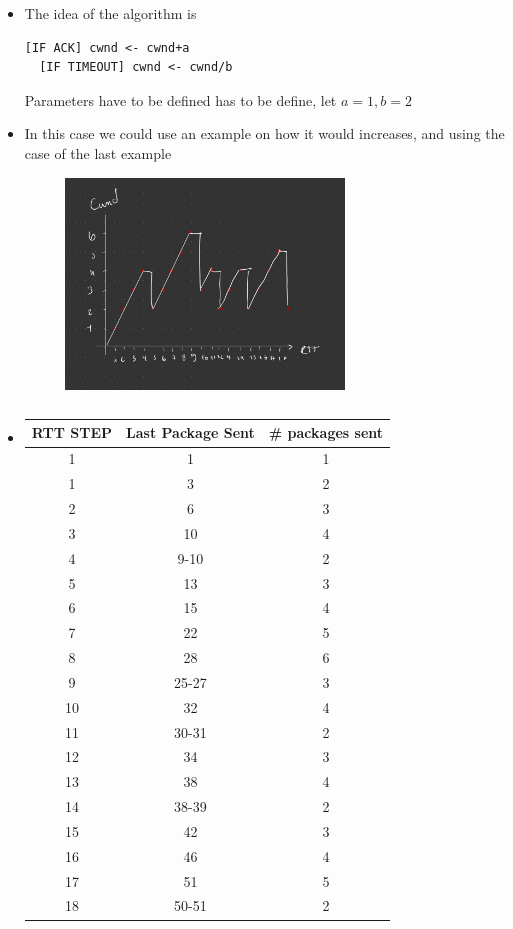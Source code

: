 \documentclass{assignment}
\begin{document}
\begin{itemize}

\item The idea of the algorithm is 
  \begin{lstlisting}[]
  [IF ACK] cwnd <- cwnd+a
  [IF TIMEOUT] cwnd <- cwnd/b
  \end{lstlisting} 
  Parameters have to be defined has to be define, let $a=1, b =2$
  \item
In this case  we could use an example on how it would increases, and using the case of the last example
    \begin{figure}[h]
      \begin{center}
        \includegraphics[width=0.7\textwidth]{public.jpeg}
      \end{center}
      \caption{}
      \label{fig:}
    \end{figure}
\item 
  \begin{table}[h]
    \caption{}
    \label{tab:}
    \begin{center}
      \begin{tabular}[c]{c|c|c}
        \hline
        \multicolumn{1}{c|}{\textbf{RTT STEP}} & 
        \multicolumn{1}{c|}{\textbf{Last Package Sent}} & 
        \multicolumn{1}{c}{\textbf{\# packages sent}} \\
        \hline
        1  & 1 & 1\\
        1  & 3 & 2\\
        2  & 6 & 3\\
        3  & 10 & 4\\
        4  & 9-10 & 2\\
        5  & 13 & 3 \\
        6  & 15 & 4\\
        7  & 22 & 5\\
        8  & 28 & 6\\
        9  & 25-27 & 3\\
        10 & 32 & 4\\
        11 & 30-31 & 2\\
        12 & 34 & 3 \\
        13 & 38 & 4 \\
        14 & 38-39 & 2 \\
        15 & 42 & 3 \\
        16 & 46 & 4 \\
        17 & 51 & 5 \\
        18 & 50-51 & 2 \\
        \hline


\end{tabular}
\end{center}
\end{table}
\end{itemize}
\end{document}
